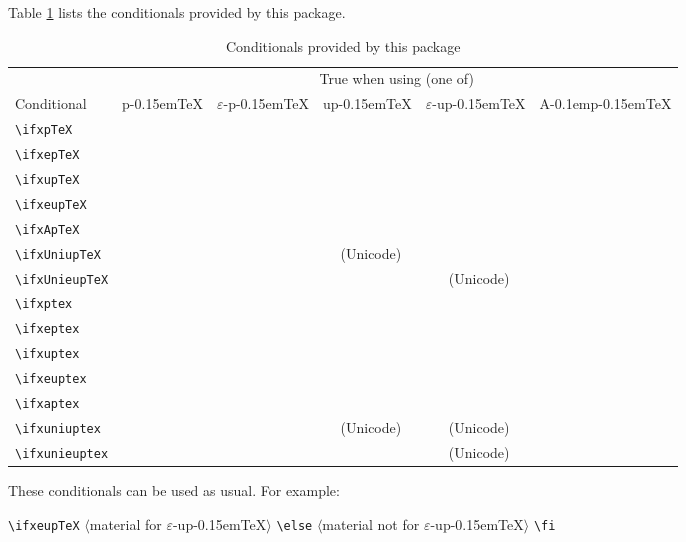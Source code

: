 \documentclass[a4paper]{article}
\newcommand\pTeX{p\kern-0.15em\TeX}
\newcommand\e{\ensuremath{\varepsilon}}
\newcommand\epTeX{\e-\pTeX}
\newcommand\upTeX{u\pTeX}
\newcommand\eupTeX{\e-\upTeX}
\newcommand\ApTeX{A\kern-0.1em\pTeX}
\newcommand\yes{\checkmark}
\newcommand\UNI{(Unicode)}
\newcommand\uni{{\footnotesize\UNI}}
\begin{document}
Table \ref{tab:cond} lists the conditionals provided by this package.
\vskip-10pt\relax
\begin{table}[ht]\centering
\caption{Conditionals provided by this package}
\label{tab:cond}
\medskip
\begin{tabular}{lccccc}
\toprule
                     & \multicolumn{5}{c}{True when using (one of)}      \\
                       \cmidrule(lr){2-6}
Conditional          & \pTeX & \epTeX & \upTeX     & \eupTeX    & \ApTeX \\
\midrule
\verb|\ifxpTeX|      & \yes  &        &            &            &        \\
\verb|\ifxepTeX|     &       & \yes   &            &            &        \\
\verb|\ifxupTeX|     &       &        & \yes       &            &        \\
\verb|\ifxeupTeX|    &       &        &            & \yes       &        \\
\verb|\ifxApTeX|     &       &        &            &            & \yes   \\
\verb|\ifxUniupTeX|  &       &        & \yes\ \uni &            &        \\
\verb|\ifxUnieupTeX| &       &        &            & \yes\ \uni &        \\
\verb|\ifxptex|      & \yes  & \yes   & \yes       & \yes       & \yes   \\
\verb|\ifxeptex|     &       & \yes   &            & \yes       &        \\
\verb|\ifxuptex|     &       &        & \yes       & \yes       & \yes   \\
\verb|\ifxeuptex|    &       &        &            & \yes       &        \\
\verb|\ifxaptex|     &       &        &            &            & \yes   \\
\verb|\ifxuniuptex|  &       &        & \yes\ \uni & \yes\ \uni & \yes   \\
\verb|\ifxunieuptex| &       &        &            & \yes\ \uni &        \\
\bottomrule
\end{tabular}
\end{table}
\noindent These conditionals can be used as usual. For example:

\medskip

\noindent{\ttfamily\hskip2em}%
\verb|\ifxeupTeX|%
  \ensuremath{\langle}material     for \eupTeX\ensuremath{\rangle}%
\verb|\else|%
  \ensuremath{\langle}material not for \eupTeX\ensuremath{\rangle}%
\verb|\fi|
\end{document}
